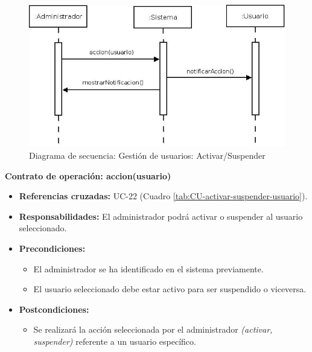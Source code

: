 \begin{figure}[H]
\centering
  \includegraphics[scale=.50]{img/secuencias/gestion-usuarios-activar-suspender.jpeg}
  \caption{Diagrama de secuencia: Gestión de usuarios: Activar/Suspender}
  \label{fig:secuencia-gestion-usuarios-activar-suspender}
\end{figure}

\textbf{Contrato de operación: accion(usuario)}
\begin{itemize}
\item \textbf{Referencias cruzadas:} UC-22 (Cuadro \ref{tab:CU-activar-suspender-usuario}).
\item \textbf{Responsabilidades:} El administrador podrá activar o suspender al usuario seleccionado.
\item \textbf{Precondiciones:} 
 \begin{itemize}
\item El administrador se ha identificado en el sistema previamente.
\item El usuario seleccionado debe estar activo para ser suspendido o viceversa.
\end {itemize}
\item \textbf{Postcondiciones:} 
 \begin{itemize}
\item Se realizará la acción seleccionada por el administrador \textit{(activar, suspender)} referente a un usuario específico.
\end {itemize}
\end {itemize}


